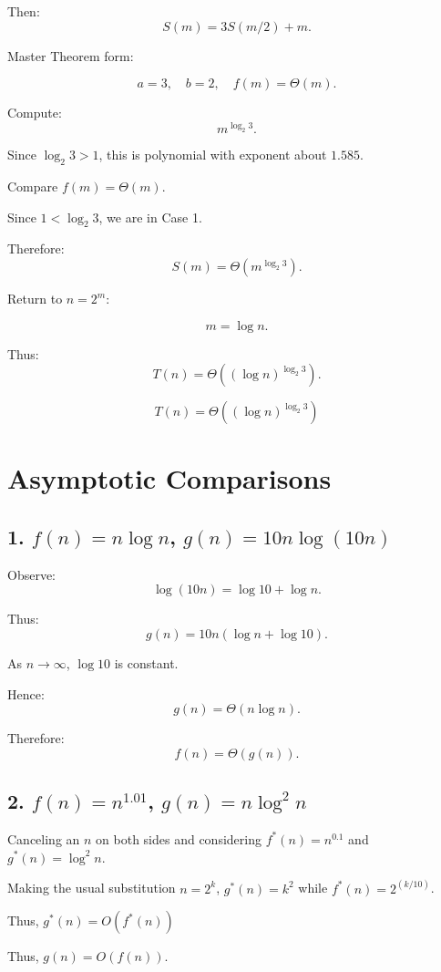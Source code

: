 \documentclass[11pt]{article}
\begin{document}
Then:
\[
S(m)=3S(m/2)+m.
\]

Master Theorem form:

\[
a=3,\quad b=2,\quad f(m)=\Theta(m).
\]

Compute:
\[
m^{\log_2 3}.
\]

Since $\log_2 3>1$, this is polynomial with exponent about $1.585$.

Compare $f(m)=\Theta(m)$.

Since $1 < \log_2 3$, we are in Case 1.

Therefore:
\[
S(m)=\Theta(m^{\log_2 3}).
\]

Return to $n=2^m$:

\[
m=\log n.
\]

Thus:
\[
T(n)=\Theta((\log n)^{\log_2 3}).
\]

\[
\boxed{T(n)=\Theta((\log n)^{\log_2 3})}
\]
\newpage
\section{Asymptotic Comparisons}

\subsection{1. $f(n)=n\log n$, $g(n)=10n\log(10n)$}

Observe:
\[
\log(10n)=\log 10 + \log n.
\]

Thus:
\[
g(n)=10n(\log n + \log 10).
\]

As $n\to\infty$, $\log 10$ is constant.

Hence:
\[
g(n)=\Theta(n\log n).
\]

Therefore:
\[
f(n)=\Theta(g(n)).
\]

\newpage

\subsection{2. $f(n)=n^{1.01}$, $g(n)=n\log^2 n$}

Canceling an $n$ on both sides and considering $f^*(n) = n^{0.1}$ and $g^*(n) = \log^2 n$.

Making the usual substitution $n = 2^k$, $g^*(n) = k^2$ while $f^*(n) = 2^(k/10)$.

Thus, $g^*(n) = O(f^*(n))$

Thus, $g(n) = O(f(n))$.\\
\end{document}
